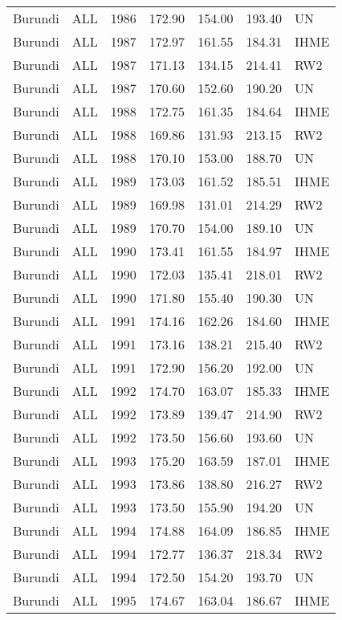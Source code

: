 \begin{longtable}{lllrrrl}
  Burundi & ALL & 1986 & 172.90 & 154.00 & 193.40 & UN \\ 
  Burundi & ALL & 1987 & 172.97 & 161.55 & 184.31 & IHME \\ 
  Burundi & ALL & 1987 & 171.13 & 134.15 & 214.41 & RW2 \\ 
  Burundi & ALL & 1987 & 170.60 & 152.60 & 190.20 & UN \\ 
  Burundi & ALL & 1988 & 172.75 & 161.35 & 184.64 & IHME \\ 
  Burundi & ALL & 1988 & 169.86 & 131.93 & 213.15 & RW2 \\ 
  Burundi & ALL & 1988 & 170.10 & 153.00 & 188.70 & UN \\ 
  Burundi & ALL & 1989 & 173.03 & 161.52 & 185.51 & IHME \\ 
  Burundi & ALL & 1989 & 169.98 & 131.01 & 214.29 & RW2 \\ 
  Burundi & ALL & 1989 & 170.70 & 154.00 & 189.10 & UN \\ 
  Burundi & ALL & 1990 & 173.41 & 161.55 & 184.97 & IHME \\ 
  Burundi & ALL & 1990 & 172.03 & 135.41 & 218.01 & RW2 \\ 
  Burundi & ALL & 1990 & 171.80 & 155.40 & 190.30 & UN \\ 
  Burundi & ALL & 1991 & 174.16 & 162.26 & 184.60 & IHME \\ 
  Burundi & ALL & 1991 & 173.16 & 138.21 & 215.40 & RW2 \\ 
  Burundi & ALL & 1991 & 172.90 & 156.20 & 192.00 & UN \\ 
  Burundi & ALL & 1992 & 174.70 & 163.07 & 185.33 & IHME \\ 
  Burundi & ALL & 1992 & 173.89 & 139.47 & 214.90 & RW2 \\ 
  Burundi & ALL & 1992 & 173.50 & 156.60 & 193.60 & UN \\ 
  Burundi & ALL & 1993 & 175.20 & 163.59 & 187.01 & IHME \\ 
  Burundi & ALL & 1993 & 173.86 & 138.80 & 216.27 & RW2 \\ 
  Burundi & ALL & 1993 & 173.50 & 155.90 & 194.20 & UN \\ 
  Burundi & ALL & 1994 & 174.88 & 164.09 & 186.85 & IHME \\ 
  Burundi & ALL & 1994 & 172.77 & 136.37 & 218.34 & RW2 \\ 
  Burundi & ALL & 1994 & 172.50 & 154.20 & 193.70 & UN \\ 
  Burundi & ALL & 1995 & 174.67 & 163.04 & 186.67 & IHME \\ 

\end{longtable}
